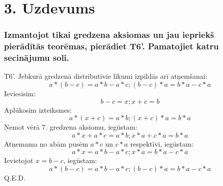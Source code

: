 \documentclass{article}
\begin{document}
\section*{3. Uzdevums}
\subsubsection*{Izmantojot tikai gredzena aksiomas un jau iepriekš pierādītās teorēmas, pierādiet  T6'. Pamatojiet katru secinājumu soli.}

T6'. Jebkurā gredzenā distributīvie likumi
izpildās arī atņemšanai:
\begin{equation*}
    a*(b-c)=a*b-a*c; (b-c)*a=b*a-c*a
\end{equation*}
Ieviesīsim:
\begin{equation*}
    b-c=x; x+c=b
\end{equation*}
Aplūkosim izteiksmes:
\begin{equation*}
    a*(x+c)=a*b; (x+c)*a=b*a
\end{equation*}
Ņemot vērā 7. gredzena aksiomu, iegūstam:
\begin{equation*}
    a*x+a*c=a*b; x*a+c*a=b*a
\end{equation*}
Atņemama no abām pusēm $a*c$ un $c*a$ respektīvi, iegūstam:
\begin{equation*}
    a*x=a*b-a*c; x*a=b*a-c*a
\end{equation*}
Ievietojot $x=b-c$, iegūstam:
\begin{equation*}
    a*(b-c)=a*b-a*c; (b-c)*a=b*a-c*a
\end{equation*}
Q.E.D.
\end{document}
